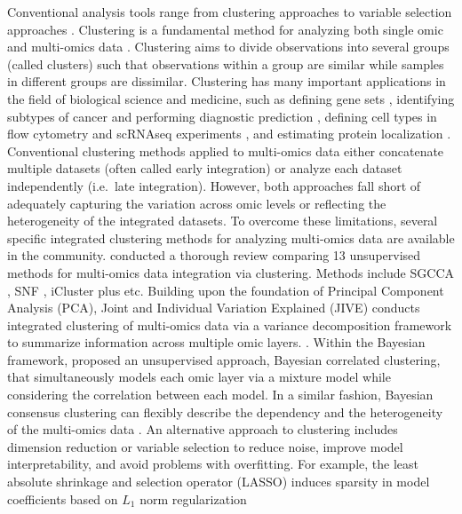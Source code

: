 Conventional analysis tools range from clustering approaches to variable
selection approaches \citep{gonzalez2019omic}. Clustering is a fundamental
method for analyzing both single omic and multi-omics data
\citep{rappoport2018multi}. Clustering aims to divide observations into
several groups (called clusters) such that observations within a group
are similar while samples in different groups are dissimilar. Clustering
has many important applications in the field of biological science and
medicine, such as defining gene sets \citep{hejblum2015time}, identifying
subtypes of cancer and performing diagnostic prediction
\citep{curtis2012genomic, khan2001classification}, defining cell types in
flow cytometry and scRNAseq experiments
\citep{chan2008statistical, hejblum2019sequential, prabhakaran2016dirichlet},
and estimating protein localization \citep{crook2018bayesian}. Conventional
clustering methods applied to multi-omics data either concatenate
multiple datasets (often called early integration) or analyze each
dataset independently (i.e.~late integration). However, both approaches
fall short of adequately capturing the variation across omic levels or
reflecting the heterogeneity of the integrated datasets. To overcome
these limitations, several specific integrated clustering methods for
analyzing multi-omics data are available in the community.
\citet{pierre2020clustering} conducted a thorough review comparing 13
unsupervised methods for multi-omics data integration via clustering.
Methods include SGCCA \citep{tenenhaus2014variable}, SNF
\citep{wang2014similarity}, iCluster plus \citep{mo2013pattern} etc. Building upon
the foundation of Principal Component Analysis (PCA), Joint and
Individual Variation Explained (JIVE) conducts integrated clustering of
multi-omics data via a variance decomposition framework to summarize
information across multiple omic layers. \citep{lock2013joint}. Within the
Bayesian framework, \citet{kirk2012bayesian} proposed an unsupervised approach,
Bayesian correlated clustering, that simultaneously models each omic
layer via a mixture model while considering the correlation between each
model. In a similar fashion, Bayesian consensus clustering can flexibly
describe the dependency and the heterogeneity of the multi-omics data
\citep{lock2013bayesian}. An alternative approach to clustering includes
dimension reduction or variable selection to reduce noise, improve model
interpretability, and avoid problems with overfitting. For example, the
least absolute shrinkage and selection operator (LASSO) induces sparsity
in model coefficients based on \(L_1\) norm regularization
